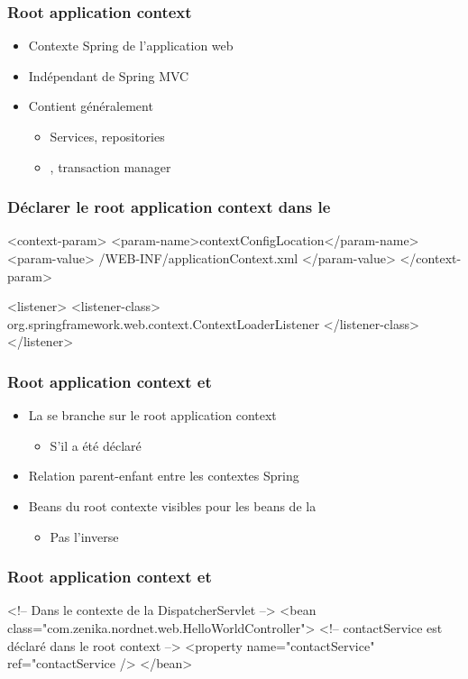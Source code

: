 \begin{frame}
 \frametitle{Root application context}
 
  \begin{itemize}
   \item Contexte Spring de l'application web
   \item Indépendant de Spring MVC
   \item Contient généralement
   \begin{itemize}
    \item Services, repositories
    \item {}, transaction manager
   \end{itemize}
  \end{itemize}
 
\end{frame}

\begin{frame}[fragile]
 \frametitle{Déclarer le root application context dans le }
  
 \begin{xmlcode}
<context-param>
  <param-name>contextConfigLocation</param-name>
  <param-value>
    /WEB-INF/applicationContext.xml
  </param-value>
</context-param>

<listener>
  <listener-class>
    org.springframework.web.context.ContextLoaderListener
  </listener-class>
</listener>
 \end{xmlcode}
 
\end{frame}

\begin{frame}
 \frametitle{Root application context et }
 
 \begin{itemize}
  \item La  se branche sur le root application context
  \begin{itemize}
   \item S'il a été déclaré
  \end{itemize}
  \item Relation parent-enfant entre les contextes Spring
  \item Beans du root contexte visibles pour les beans de la 
  \begin{itemize}
   \item Pas l'inverse
  \end{itemize}
 \end{itemize}
 
\end{frame}

\begin{frame}[fragile]
 \frametitle{Root application context et }
 
 \begin{xmlcode}
<!-- Dans le contexte de la DispatcherServlet -->
<bean class="com.zenika.nordnet.web.HelloWorldController">
  <!-- contactService est d\'eclar\'e dans le root context -->
  <property name="contactService" 
            ref="contactService />
</bean>
 \end{xmlcode}
 
\end{frame}